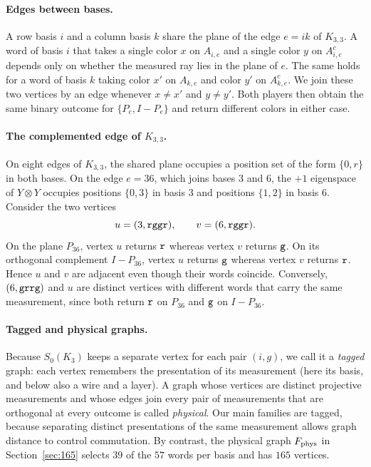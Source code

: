 \paragraph{Edges between bases.}
A row basis $i$ and a column basis $k$ share the plane of the edge $e=ik$ of $K_{3,3}$. A word of basis $i$ that takes a single color $x$ on $A_{i,e}$ and a single color $y$ on $A_{i,e}^c$ depends only on whether the measured ray lies in the plane of $e$. The same holds for a word of basis $k$ taking color $x'$ on $A_{k,e}$ and color $y'$ on $A_{k,e}^c$. We join these two vertices by an edge whenever $x\ne x'$ and $y\ne y'$. Both players then obtain the same binary outcome for $\{P_e,I-P_e\}$ and return different colors in either case.

\paragraph{The complemented edge of $K_{3,3}$.}
On eight edges of $K_{3,3}$, the shared plane occupies a position set of the form $\{0,r\}$ in both bases. On the edge $e=36$, which joins bases $3$ and $6$, the $+1$ eigenspace of $Y\otimes Y$ occupies positions $\{0,3\}$ in basis $3$ and positions $\{1,2\}$ in basis $6$. Consider the two vertices
\[
 u=(3,\mathtt{rggr}),\qquad
 v=(6,\mathtt{rggr}).
\]
On the plane $P_{36}$, vertex $u$ returns $\mathtt{r}$ whereas vertex $v$ returns $\mathtt{g}$. On its orthogonal complement $I-P_{36}$, vertex $u$ returns $\mathtt{g}$ whereas vertex $v$ returns $\mathtt{r}$. Hence $u$ and $v$ are adjacent even though their words coincide. Conversely, $(6,\mathtt{grrg})$ and $u$ are distinct vertices with different words that carry the same measurement, since both return $\mathtt{r}$ on $P_{36}$ and $\mathtt{g}$ on $I-P_{36}$.

\paragraph{Tagged and physical graphs.}
Because $S_0(K_3)$ keeps a separate vertex for each pair $(i,g)$, we call it a \emph{tagged} graph: each vertex remembers the presentation of its measurement (here its basis, and below also a wire and a layer). A graph whose vertices are distinct projective measurements and whose edges join every pair of measurements that are orthogonal at every outcome is called \emph{physical}. Our main families are tagged, because separating distinct presentations of the same measurement allows graph distance to control commutation. By contrast, the physical graph $F_{\rm phys}$ in Section~\ref{sec:165} selects $39$ of the $57$ words per basis and has $165$ vertices.

